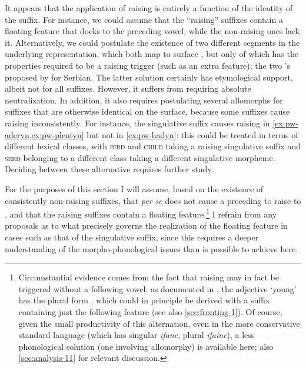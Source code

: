 It appears that the application of raising is entirely a function of the identity of the suffix. For instance, we could assume that the \enquote{raising} suffixes contain a floating feature that docks to the preceding vowel, while the non-raising ones lack it. Alternatively, we could postulate the existence of two different \ipa{[i]} segments in the underlying representation, which both map to surface \ipa{[i]}, but only of which has the properties required to be a raising trigger (such as an extra feature); \cf the two \ipa{[i]}'s proposed by \citet{moren-serbian} for Serbian. The latter solution certainly has etymological support, albeit not for all suffixes. However, it suffers from requiring absolute neutralization. In addition, it also requires postulating several allomorphs for suffixes that are otherwise identical on the surface, because some suffixes cause raising inconsistently. For instance, the singulative suffix  causes raising in \cref{ex:pw-aderyn,ex:pw-plentyn} but not in \cref{ex:pw-hadyn}: this could be treated in terms of different lexical classes, with \textsc{bird} and \textsc{child} taking a raising singulative suffix and \textsc{seed} belonging to a different class taking a different singulative morpheme. Deciding between these alternative requires further study.

For the purposes of this section I will assume, based on the existence of consistently non-raising suffixes, that \ipa{[i]} \emph{per se} does not cause a preceding \ipa{[a]} to raise to \ipa{[e]}, and that the raising suffixes contain a floating  feature.\footnote{Circumstantial evidence comes from the fact that raising may in fact be triggered without a following vowel: as documented in \citet[\emph{sub voce}]{thomas00:_welsh}, the adjective \ipa{[ˈiːvaŋk]} `young' has the plural form \ipa{[ˈiːveŋk]}, which could in principle be derived with a suffix containing just the following feature (see also \cref{sec:fronting-1}). Of course, given the small productivity of this alternation, even in the more conservative standard language (which has singular \emph{ifanc}, plural \emph{ifainc}), a less phonological solution (\ie one involving allomorphy) is available here; \cf also \cref{sec:analysis-11} for relevant discussion.} I refrain from any proposals as to what precisely governs the realization of the floating feature in cases such as that of the singulative suffix, since this requires a deeper understanding of the morpho\hyp phonological issues than is possible to achieve here.

